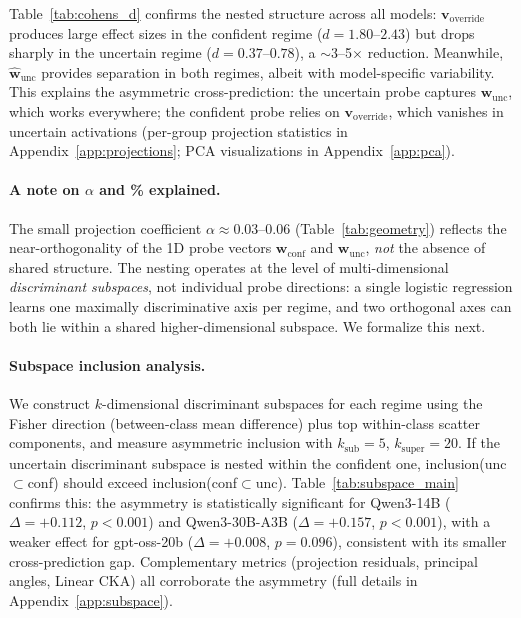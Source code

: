 \documentclass[11pt]{article}
\begin{document}
Table~\ref{tab:cohens_d} confirms the nested structure across all models:
$\mathbf{v}_{\text{override}}$ produces large effect sizes in the confident regime ($d = 1.80$--$2.43$) but drops sharply in the uncertain regime ($d = 0.37$--$0.78$), a $\sim$3--5$\times$ reduction.
Meanwhile, $\hat{\mathbf{w}}_{\text{unc}}$ provides separation in both regimes, albeit with model-specific variability.
This explains the asymmetric cross-prediction: the uncertain probe captures $\mathbf{w}_{\text{unc}}$, which works everywhere; the confident probe relies on $\mathbf{v}_{\text{override}}$, which vanishes in uncertain activations (per-group projection statistics in Appendix~\ref{app:projections}; PCA visualizations in Appendix~\ref{app:pca}).

\paragraph{A note on $\alpha$ and \% explained.}
The small projection coefficient $\alpha \approx 0.03$--$0.06$ (Table~\ref{tab:geometry}) reflects the near-orthogonality of the 1D probe vectors $\mathbf{w}_{\text{conf}}$ and $\mathbf{w}_{\text{unc}}$, \emph{not} the absence of shared structure.
The nesting operates at the level of multi-dimensional \emph{discriminant subspaces}, not individual probe directions: a single logistic regression learns one maximally discriminative axis per regime, and two orthogonal axes can both lie within a shared higher-dimensional subspace.
We formalize this next.

\paragraph{Subspace inclusion analysis.}
We construct $k$-dimensional discriminant subspaces for each regime using the Fisher direction (between-class mean difference) plus top within-class scatter components, and measure asymmetric inclusion with $k_{\text{sub}}{=}5$, $k_{\text{super}}{=}20$.
If the uncertain discriminant subspace is nested within the confident one, inclusion(unc${\subset}$conf) should exceed inclusion(conf${\subset}$unc).
Table~\ref{tab:subspace_main} confirms this: the asymmetry is statistically significant for Qwen3-14B ($\Delta = +0.112$, $p < 0.001$) and Qwen3-30B-A3B ($\Delta = +0.157$, $p < 0.001$), with a weaker effect for gpt-oss-20b ($\Delta = +0.008$, $p = 0.096$), consistent with its smaller cross-prediction gap.
Complementary metrics (projection residuals, principal angles, Linear CKA) all corroborate the asymmetry (full details in Appendix~\ref{app:subspace}).
\end{document}
